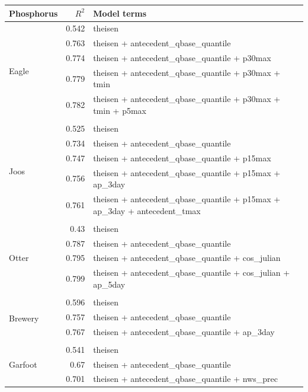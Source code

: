 \documentclass[10pt]{article}
\begin{document}
\begin{table}[h] \small
    \begin{center}
    \begin{tabular}{lrl}
    \textbf{Phosphorus} & $R^2$ & Model terms \\
    \hline
\multirow{6}{*}{Eagle} & 0.542 & theisen\\ 
 & 0.763 & theisen + antecedent\_qbase\_quantile\\ 
 & 0.774 & theisen + antecedent\_qbase\_quantile + p30max\\ 
 & 0.779 & theisen + antecedent\_qbase\_quantile + p30max + tmin\\ 
 & 0.782 & theisen + antecedent\_qbase\_quantile + p30max + tmin + p5max\\ 
\vspace{2mm}\\ \multirow{6}{*}{Joos} & 0.525 & theisen\\ 
 & 0.734 & theisen + antecedent\_qbase\_quantile\\ 
 & 0.747 & theisen + antecedent\_qbase\_quantile + p15max\\ 
 & 0.756 & theisen + antecedent\_qbase\_quantile + p15max + ap\_3day\\ 
 & 0.761 & theisen + antecedent\_qbase\_quantile + p15max + ap\_3day + antecedent\_tmax\\ 
\vspace{2mm}\\ \multirow{5}{*}{Otter} & 0.43 & theisen\\ 
 & 0.787 & theisen + antecedent\_qbase\_quantile\\ 
 & 0.795 & theisen + antecedent\_qbase\_quantile + cos\_julian\\ 
 & 0.799 & theisen + antecedent\_qbase\_quantile + cos\_julian + ap\_5day\\ 
\vspace{2mm}\\ \multirow{4}{*}{Brewery} & 0.596 & theisen\\ 
 & 0.757 & theisen + antecedent\_qbase\_quantile\\ 
 & 0.767 & theisen + antecedent\_qbase\_quantile + ap\_3day\\ 
\vspace{2mm}\\ \multirow{5}{*}{Garfoot} & 0.541 & theisen\\ 
 & 0.67 & theisen + antecedent\_qbase\_quantile\\ 
 & 0.701 & theisen + antecedent\_qbase\_quantile + nws\_prec\\ 

\end{tabular}
\end{center}
\end{table}
\end{document}
